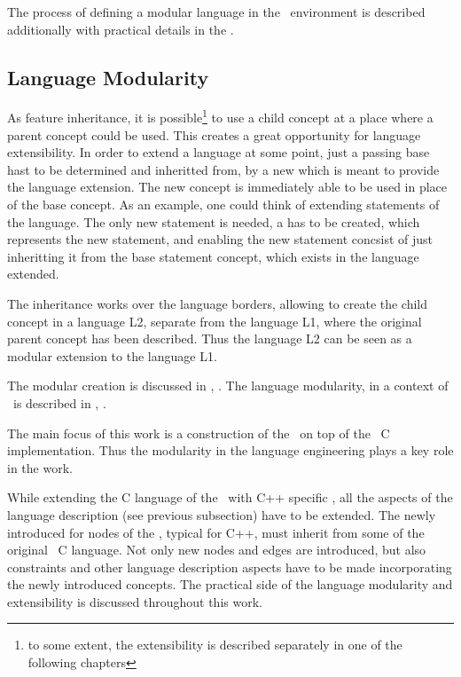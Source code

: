 The process of defining a modular language in the \jbmps\ environment is described additionally with practical details in the .

\subsection{Language Modularity}
\label{modularity}

As  feature inheritance, it is possible\footnote{to some extent, the extensibility is described separately in one of the following chapters} 
to use a child concept at a place where a parent concept could be used. This creates a great opportunity for language extensibility. In order to 
extend a language at some point, just a passing base  hast to be determined and inheritted from, by a new  which is meant
to provide the language extension. The new concept is immediately able to be used in place of the base concept. As an example, one could think 
of extending statements of the language. The only new statement is needed, a  has to be created, which represents the new statement, 
and enabling the new statement concsist of just inheritting it from the base statement concept, which exists in the language extended.

The inheritance works over the language borders, allowing to create the child concept
in a language L2, separate from the language L1, where the original parent concept has been described. Thus the language L2 can be seen as a modular extension to the
language L1. 

The modular  creation is discussed in \cite{1998_hudak_modular_dsl_and_tools}, \cite{2006_wyk_modular_dsl_extensions}. 
The language modularity, in a context of \jbmps\ is described in \cite{2012_ratiu_modular_dsls_and_analyses}, \cite{Voelter2011}.

The main focus of this work is a construction of the \cpppl\ on top of the \mbdr\ C implementation. Thus the modularity in the language engineering 
plays a key role in the work.

While extending the C language of the \mbdr\ with C++ specific , all the aspects of the language description (see previous subsection) have
to be extended. The newly introduced  for nodes of the , typical for C++, must inherit from some  of the original 
\mbp\ C language. Not only new nodes and edges are introduced, but also constraints and other language description aspects have to be made incorporating the
newly introduced concepts. The practical side of the language modularity and extensibility is discussed throughout this work.

